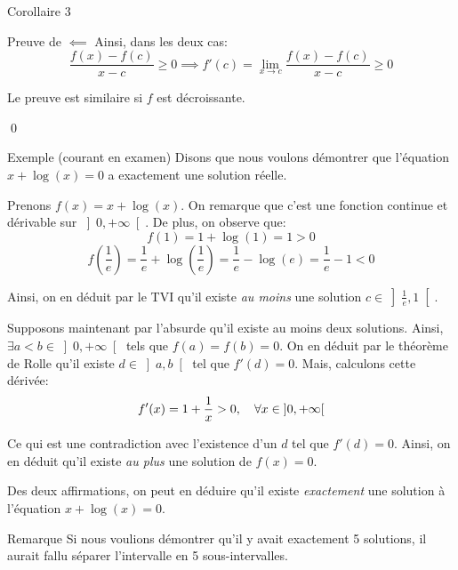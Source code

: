 \documentclass[a4paper]{article}
\begin{document}
\begin{parag}{Corollaire 3}
\begin{subparag}{Preuve de $\impliedby$}
        Ainsi, dans les deux cas: 
        \[\frac{f\left(x\right) - f\left(c\right)}{x - c} \geq 0 \implies f'\left(c\right) = \lim_{x \to c} \frac{f\left(x\right) - f\left(c\right)}{x - c} \geq 0\]
        
        Le preuve est similaire si $f$ est décroissante.

        \qed
    \end{subparag}

\end{parag}

\begin{parag}{Exemple (courant en examen)}
    Disons que nous voulons démontrer que l'équation $x + \log\left(x\right) = 0$ a exactement une solution réelle.

    Prenons $f\left(x\right) = x + \log\left(x\right)$. On remarque que c'est une fonction continue et dérivable sur $\left]0, +\infty\right[ $. De plus, on observe que: 
    \[f\left(1\right) = 1 + \log\left(1\right) = 1 > 0\]
    \[f\left(\frac{1}{e}\right) = \frac{1}{e} + \log\left(\frac{1}{e}\right) = \frac{1}{e} - \log\left(e\right) = \frac{1}{e} - 1 < 0\]
    
    Ainsi, on en déduit par le TVI qu'il existe \textit{au moins} une solution $c \in \left]\frac{1}{e}, 1\right[ $.

    Supposons maintenant par l'absurde qu'il existe au moins deux solutions. Ainsi, $\exists a < b \in \left]0, +\infty\right[  $ tels que $f\left(a\right) = f\left(b\right) = 0$. On en déduit par le théorème de Rolle qu'il existe $d \in \left]a, b\right[ $ tel que $f'\left(d\right) = 0$. Mais, calculons cette dérivée: 
    \[f'\left(x\right) = 1 + \frac{1}{x} > 0, \mathspace \forall x \in \left]0, +\infty\right[ \]
    
    Ce qui est une contradiction avec l'existence d'un $d$ tel que $f'\left(d\right) = 0$. Ainsi, on en déduit qu'il existe \textit{au plus} une solution de $f\left(x\right) = 0$.

    Des deux affirmations, on peut en déduire qu'il existe \textit{exactement} une solution à l'équation $x + \log\left(x\right) = 0$.

    \begin{subparag}{Remarque}
        Si nous voulions démontrer qu'il y avait exactement 5 solutions, il aurait fallu séparer l'intervalle en 5 sous-intervalles.
    \end{subparag}
\end{parag}
\end{document}
